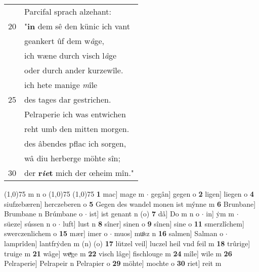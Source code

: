 \documentclass[8pt,a4paper,notitlepage]{article}
\begin{document}
\begin{table}[ht]
\begin{minipage}[t]{0.5\linewidth}
\begin{tabular}{rl}
 & Parcifal sprach alzehant:\\ 
20 & "\textbf{in} dem sê den künic ich vant\\ 
 & geankert ûf dem w\textit{â}ge,\\ 
 & ich wæne durch visch l\textit{â}ge\\ 
 & oder durch ander kurzewîle.\\ 
 & ich hete manige \textit{m}île\\ 
25 & des tages dar gestrichen.\\ 
 & Pelraperie ich was entwichen\\ 
 & reht umb den mitten morgen.\\ 
 & des âbendes pflac ich sorgen,\\ 
 & wâ diu herberge möhte sîn;\\ 
30 & der \textbf{r\textit{ie}t} mich der œheim mîn."\\ 
\end{tabular}
\scriptsize
\line(1,0){75} \newline
m n o \newline
\line(1,0){75} \newline
\newline
\line(1,0){75} \newline
\textbf{1} mac] mage m  $\cdot$ gegân] gegen o \textbf{2} ligen] liegen o \textbf{4} siufzebæren] herczeberen o \textbf{5} Gegen des wandel monen ist mýnne m \textbf{6} Brunbane] Brumbane n Brúmbane o  $\cdot$ ist] ist genant n (o) \textbf{7} dâ] Do m n o  $\cdot$ in] ẏm m  $\cdot$ süeze] sússen n o  $\cdot$ luft] lust n \textbf{8} sîner] sinen o \textbf{9} sînen] sine o \textbf{11} smerzlîchem] swerczenlichem o \textbf{15} mær] imer o  $\cdot$ muos] muͦsz n \textbf{16} salmen] Salman o  $\cdot$ lamprîden] lantfrẏden m (n) (o) \textbf{17} lützel veil] luczel heil vnd feil m \textbf{18} trûrige] truige m \textbf{21} wâge] weͯge m \textbf{22} visch lâge] fischlouge m \textbf{24} mîle] wile m \textbf{26} Pelraperie] Pelrapeir n Pelrapier o \textbf{29} möhte] mochte o \textbf{30} riet] reit m \newline
\end{minipage}
\end{table}
\newpage
\end{document}
